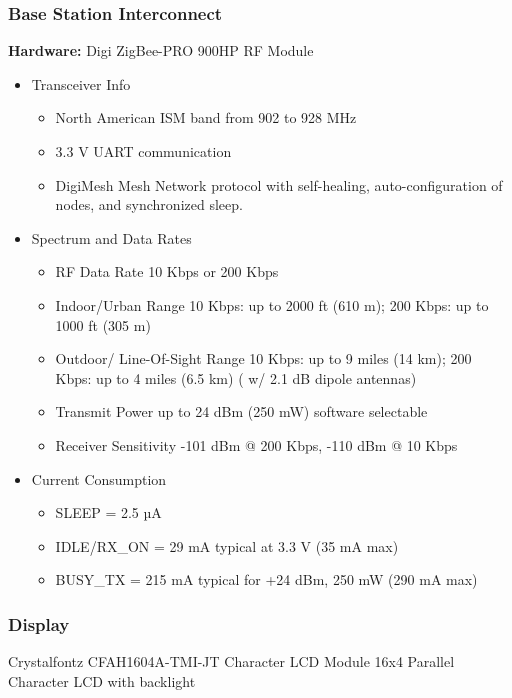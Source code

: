 \documentclass[journal,compsoc]{IEEEtran}
\begin{document}
\subsubsection{Base Station Interconnect}

\textbf {Hardware:} Digi ZigBee-PRO 900HP RF Module

\begin{itemize}
  \item Transceiver Info
    \begin{itemize}
      \item North American ISM band from 902 to 928 MHz
      \item 3.3 V UART communication
      \item DigiMesh Mesh Network protocol with self-healing, auto-configuration of nodes, and synchronized sleep.
    \end{itemize}
  \item Spectrum and Data Rates
    \begin{itemize}
      \item RF Data Rate  10 Kbps or 200 Kbps
      \item Indoor/Urban Range  10 Kbps: up to 2000 ft (610 m); 200 Kbps: up to 1000 ft (305 m)
      \item Outdoor/ Line-Of-Sight Range  10 Kbps: up to 9 miles (14 km); 200 Kbps: up to 4 miles (6.5 km) ( w/ 2.1 dB dipole antennas)
      \item Transmit Power up to 24 dBm (250 mW) software selectable
      \item Receiver Sensitivity  -101 dBm @ 200 Kbps, -110 dBm @ 10 Kbps
    \end{itemize}
  \item Current Consumption
    \begin{itemize}
      \item SLEEP = 2.5 µA
      \item IDLE/RX\_ON = 29 mA typical at 3.3 V (35 mA max)
      \item BUSY\_TX = 215 mA typical for +24 dBm, 250 mW (290 mA max)
    \end{itemize}
\end{itemize}

\subsubsection{Display}

Crystalfontz CFAH1604A-TMI-JT Character LCD Module
16x4 Parallel Character LCD with backlight
\end{document}
